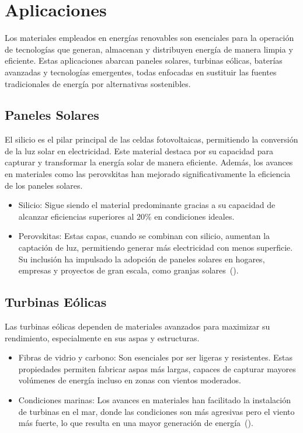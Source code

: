 \documentclass[letterpaper, 12pt]{article}
\begin{document}
\section{Aplicaciones}

Los materiales empleados en energías renovables son esenciales para la
operación de tecnologías que generan, almacenan y distribuyen energía de manera
limpia y eficiente. Estas aplicaciones abarcan paneles solares, turbinas
eólicas, baterías avanzadas y tecnologías emergentes, todas enfocadas en
sustituir las fuentes tradicionales de energía por alternativas sostenibles.

\subsection*{Paneles Solares}

El silicio es el pilar principal de las celdas fotovoltaicas, permitiendo la
conversión de la luz solar en electricidad. Este material destaca por su
capacidad para capturar y transformar la energía solar de manera eficiente.
Además, los avances en materiales como las perovskitas han mejorado
significativamente la eficiencia de los paneles solares.

\begin{itemize}
      \item Silicio: Sigue siendo el material predominante gracias a su capacidad de
            alcanzar eficiencias superiores al 20\% en condiciones ideales.

      \item Perovskitas: Estas capas, cuando se combinan con silicio, aumentan la captación
            de luz, permitiendo generar más electricidad con menos superficie. Su inclusión
            ha impulsado la adopción de paneles solares en hogares, empresas y proyectos de
            gran escala, como granjas solares~(\cite{Henriksson2021}).
\end{itemize}

\subsection*{Turbinas Eólicas}

Las turbinas eólicas dependen de materiales avanzados para maximizar su
rendimiento, especialmente en sus aspas y estructuras.

\begin{itemize}
      \item Fibras de vidrio y carbono: Son esenciales por ser ligeras y resistentes. Estas
            propiedades permiten fabricar aspas más largas, capaces de capturar mayores
            volúmenes de energía incluso en zonas con vientos moderados.

      \item Condiciones marinas: Los avances en materiales han facilitado la instalación de
            turbinas en el mar, donde las condiciones son más agresivas pero el viento más
            fuerte, lo que resulta en una mayor generación de
            energía~(\cite{Ebhota_Jen2019}).
\end{itemize}
\end{document}
